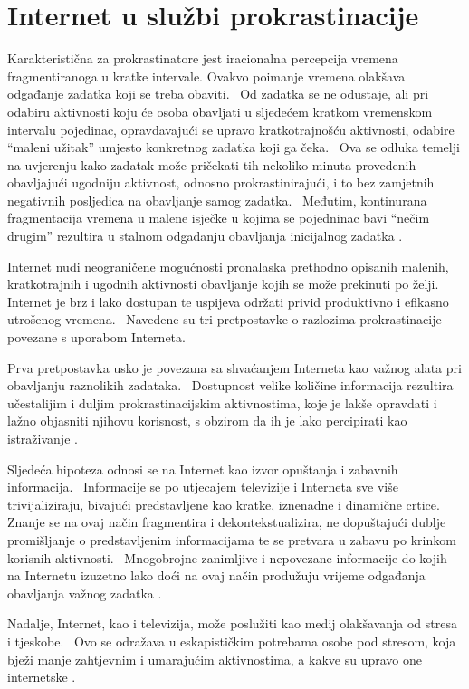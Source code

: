 \documentclass[11pt,twocolumn,english]{article}
\begin{document}
\section{Internet u službi prokrastinacije}
Karakteristična za prokrastinatore jest iracionalna percepcija vremena fragmentiranoga u kratke
intervale. Ovakvo poimanje vremena olakšava odgađanje zadatka koji se treba obaviti.~ Od zadatka se
ne odustaje, ali pri odabiru aktivnosti koju će osoba obavljati u sljedećem kratkom
vremenskom intervalu pojedinac, opravdavajući se upravo kratkotrajnošću aktivnosti, odabire ``maleni užitak''
umjesto konkretnog zadatka koji ga čeka.~ Ova se odluka temelji na uvjerenju kako zadatak može pričekati
tih nekoliko minuta provedenih obavljajući ugodniju aktivnost, odnosno prokrastinirajući, i to bez
zamjetnih negativnih posljedica na obavljanje samog zadatka.~ Međutim, kontinurana fragmentacija vremena
u malene isječke u kojima se pojedninac bavi ``nečim drugim'' rezultira u stalnom odgađanju obavljanja
inicijalnog zadatka \cite{Online08thatchera}.

Internet nudi neograničene mogućnosti pronalaska prethodno opisanih malenih, kratkotrajnih i ugodnih 
aktivnosti obavljanje kojih se može prekinuti po želji.~ Internet je brz i lako dostupan te uspijeva održati 
privid produktivno i efikasno utrošenog vremena.~ Navedene su tri pretpostavke o razlozima prokrastinacije
povezane s uporabom Interneta. 

Prva pretpostavka usko je povezana sa shvaćanjem Interneta kao važnog alata pri obavljanju raznolikih 
zadataka.~ Dostupnost velike količine informacija rezultira učestalijim i duljim prokrastinacijskim 
aktivnostima, koje je lakše opravdati i lažno objasniti njihovu korisnost, s obzirom da ih je 
lako percipirati kao istraživanje \cite{Lavoie01cyberslacking}.

Sljedeća hipoteza odnosi se na Internet kao izvor opuštanja i zabavnih informacija.~ Informacije se po utjecajem 
televizije i Interneta sve više trivijaliziraju, bivajući predstavljene kao kratke, iznenadne i 
dinamične crtice.~ Znanje se na ovaj način fragmentira i dekontekstualizira, ne dopuštajući 
dublje promišljanje o predstavljenim informacijama te se pretvara u zabavu po krinkom korisnih aktivnosti.~ 
Mnogobrojne zanimljive i nepovezane informacije do kojih na Internetu izuzetno lako doći na ovaj način 
produžuju vrijeme odgađanja obavljanja važnog zadatka \cite{Postman85amusing}.

Nadalje, Internet, kao i televizija, može poslužiti kao medij olakšavanja od stresa i tjeskobe.~ 
Ovo se odražava u eskapističkim potrebama osobe pod stresom, koja bježi manje zahtjevnim i umarajućim 
aktivnostima, a kakve su upravo one internetske \cite{Lavoie01cyberslacking}.
\end{document}
